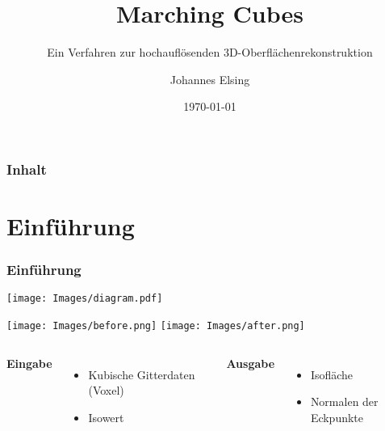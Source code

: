 \documentclass{beamer}
\title{\textbf{Marching Cubes}}
\subtitle{\small Ein Verfahren zur hochauflösenden 3D-Oberflächenrekonstruktion}
\author{Johannes Elsing}
\institute{Universität Freiburg}
\date{\today}
\begin{document}

\maketitle

\begin{frame}
  \frametitle{Inhalt}
  \tableofcontents
\end{frame}

\section{Einführung}
\begin{frame}[t]
  \frametitle{Einführung}
\begin{minipage}{\textwidth}
\texttt{[image: Images/diagram.pdf]}
\end{minipage}
\begin{center}
\texttt{[image: Images/before.png]}
\hspace{2.8cm}
\texttt{[image: Images/after.png]}
\end{center}

\vfill
\begin{columns}[t]
  \textbf{Eingabe}
  \begin{itemize}
    \item Kubische Gitterdaten (Voxel)
    \item Isowert
  \end{itemize}

  \textbf{Ausgabe}
  \begin{itemize}
    \item Isofläche
    \item Normalen der Eckpunkte
  \end{itemize}
\end{columns}

\end{frame}
\end{document}

